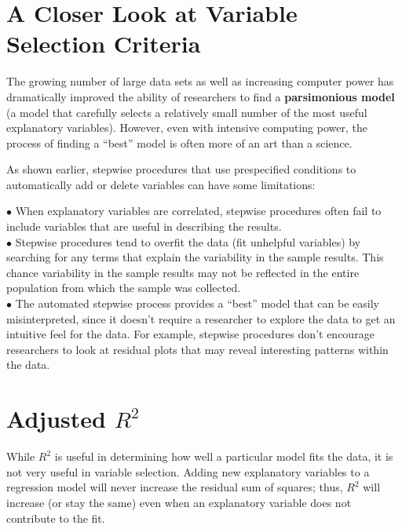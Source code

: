 \documentclass[
]{report}
\begin{document}
\section{\texorpdfstring{\textbf{A Closer Look at Variable Selection Criteria}}{A Closer Look at Variable Selection Criteria}}\label{a-closer-look-at-variable-selection-criteria}

The growing number of large data sets as well as increasing computer power has dramatically improved the ability of researchers to find a \textbf{parsimonious model} (a model that carefully selects a relatively small number of the most useful explanatory variables). However, even with intensive computing power, the process of finding a ``best'' model is often more of an art than a science.

As shown earlier, stepwise procedures that use prespecified conditions to automatically add or delete variables can have some limitations:

\(\bullet\) When explanatory variables are correlated, stepwise procedures often fail to include variables that are useful in describing the results.\\
\(\bullet\) Stepwise procedures tend to overfit the data (fit unhelpful variables) by searching for any terms that explain the variability in the sample results. This chance variability in the sample results may not be reflected in the entire population from which the sample was collected.\\
\(\bullet\) The automated stepwise process provides a ``best'' model that can be easily misinterpreted, since it doesn't require a researcher to explore the data to get an intuitive feel for the data. For example, stepwise procedures don't encourage researchers to look at residual plots that may reveal interesting patterns within the data.

\section*{\texorpdfstring{Adjusted \(R^2\)}{Adjusted R\^{}2}}\label{adjusted-r2}

While \(R^2\) is useful in determining how well a particular model fits the data, it is not very useful in variable selection. Adding new explanatory variables to a regression model will never increase the residual sum of squares; thus, \(R^2\) will increase (or stay the same) even when an explanatory variable does not contribute to the fit.
\end{document}
